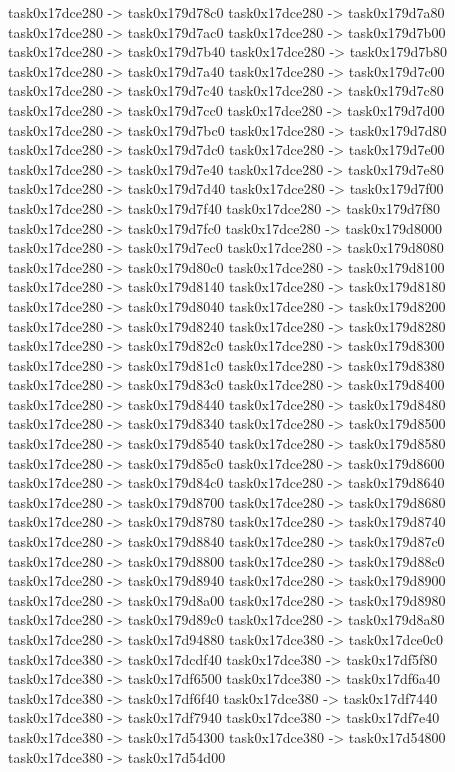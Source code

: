 {	task0x17dce280 -> task0x179d78c0
	task0x17dce280 -> task0x179d7a80
	task0x17dce280 -> task0x179d7ac0
	task0x17dce280 -> task0x179d7b00
	task0x17dce280 -> task0x179d7b40
	task0x17dce280 -> task0x179d7b80
	task0x17dce280 -> task0x179d7a40
	task0x17dce280 -> task0x179d7c00
	task0x17dce280 -> task0x179d7c40
	task0x17dce280 -> task0x179d7c80
	task0x17dce280 -> task0x179d7cc0
	task0x17dce280 -> task0x179d7d00
	task0x17dce280 -> task0x179d7bc0
	task0x17dce280 -> task0x179d7d80
	task0x17dce280 -> task0x179d7dc0
	task0x17dce280 -> task0x179d7e00
	task0x17dce280 -> task0x179d7e40
	task0x17dce280 -> task0x179d7e80
	task0x17dce280 -> task0x179d7d40
	task0x17dce280 -> task0x179d7f00
	task0x17dce280 -> task0x179d7f40
	task0x17dce280 -> task0x179d7f80
	task0x17dce280 -> task0x179d7fc0
	task0x17dce280 -> task0x179d8000
	task0x17dce280 -> task0x179d7ec0
	task0x17dce280 -> task0x179d8080
	task0x17dce280 -> task0x179d80c0
	task0x17dce280 -> task0x179d8100
	task0x17dce280 -> task0x179d8140
	task0x17dce280 -> task0x179d8180
	task0x17dce280 -> task0x179d8040
	task0x17dce280 -> task0x179d8200
	task0x17dce280 -> task0x179d8240
	task0x17dce280 -> task0x179d8280
	task0x17dce280 -> task0x179d82c0
	task0x17dce280 -> task0x179d8300
	task0x17dce280 -> task0x179d81c0
	task0x17dce280 -> task0x179d8380
	task0x17dce280 -> task0x179d83c0
	task0x17dce280 -> task0x179d8400
	task0x17dce280 -> task0x179d8440
	task0x17dce280 -> task0x179d8480
	task0x17dce280 -> task0x179d8340
	task0x17dce280 -> task0x179d8500
	task0x17dce280 -> task0x179d8540
	task0x17dce280 -> task0x179d8580
	task0x17dce280 -> task0x179d85c0
	task0x17dce280 -> task0x179d8600
	task0x17dce280 -> task0x179d84c0
	task0x17dce280 -> task0x179d8640
	task0x17dce280 -> task0x179d8700
	task0x17dce280 -> task0x179d8680
	task0x17dce280 -> task0x179d8780
	task0x17dce280 -> task0x179d8740
	task0x17dce280 -> task0x179d8840
	task0x17dce280 -> task0x179d87c0
	task0x17dce280 -> task0x179d8800
	task0x17dce280 -> task0x179d88c0
	task0x17dce280 -> task0x179d8940
	task0x17dce280 -> task0x179d8900
	task0x17dce280 -> task0x179d8a00
	task0x17dce280 -> task0x179d8980
	task0x17dce280 -> task0x179d89c0
	task0x17dce280 -> task0x179d8a80
	task0x17dce280 -> task0x17d94880
	task0x17dce380 -> task0x17dce0c0
	task0x17dce380 -> task0x17dcdf40
	task0x17dce380 -> task0x17df5f80
	task0x17dce380 -> task0x17df6500
	task0x17dce380 -> task0x17df6a40
	task0x17dce380 -> task0x17df6f40
	task0x17dce380 -> task0x17df7440
	task0x17dce380 -> task0x17df7940
	task0x17dce380 -> task0x17df7e40
	task0x17dce380 -> task0x17d54300
	task0x17dce380 -> task0x17d54800
	task0x17dce380 -> task0x17d54d00
}
